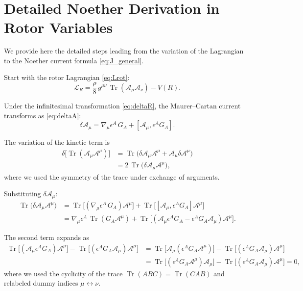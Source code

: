 \documentclass[11pt,a4paper]{article}
\numberwithin{equation}{section}
\theoremstyle{plain}
\theoremstyle{definition}
\theoremstyle{remark}
\DeclareMathOperator{\Tr}{Tr}
\begin{document}
\appendix

\section{Detailed Noether Derivation in Rotor Variables}
\label{app:noether-deriv}

We provide here the detailed steps leading from the variation of the Lagrangian to the Noether current formula \eqref{eq:J_general}.

Start with the rotor Lagrangian \eqref{eq:Lrot}:
\begin{equation}
\mathcal{L}_R = \frac{\rho}{8}\, g^{\mu\nu}\,\Tr(\mathcal{A}_\mu\mathcal{A}_\nu) - V(R).
\end{equation}

Under the infinitesimal transformation \eqref{eq:deltaR}, the Maurer--Cartan current transforms as \eqref{eq:deltaA}:
\begin{equation}
\delta \mathcal{A}_\mu = \nabla_\mu\epsilon^A\, G_A + [\mathcal{A}_\mu, \epsilon^A G_A].
\end{equation}

The variation of the kinetic term is
\begin{align}
\delta\!\big[\Tr(\mathcal{A}_\mu\mathcal{A}^\mu)\big]
&= \Tr\!\big(\delta\mathcal{A}_\mu \mathcal{A}^\mu + \mathcal{A}_\mu \delta\mathcal{A}^\mu\big) \nonumber\\
&= 2\,\Tr\!\big(\delta\mathcal{A}_\mu \mathcal{A}^\mu\big),
\end{align}
where we used the symmetry of the trace under exchange of arguments.

Substituting $\delta\mathcal{A}_\mu$:
\begin{align}
\Tr\!\big(\delta\mathcal{A}_\mu \mathcal{A}^\mu\big)
&= \Tr\!\big[(\nabla_\mu\epsilon^A\, G_A)\mathcal{A}^\mu\big] + \Tr\!\big[[\mathcal{A}_\mu, \epsilon^A G_A]\mathcal{A}^\mu\big] \nonumber\\
&= \nabla_\mu\epsilon^A\,\Tr(G_A \mathcal{A}^\mu) + \Tr\!\big[(\mathcal{A}_\mu \epsilon^A G_A - \epsilon^A G_A \mathcal{A}_\mu)\mathcal{A}^\mu\big].
\end{align}

The second term expands as
\begin{align}
\Tr\!\big[(\mathcal{A}_\mu \epsilon^A G_A)\mathcal{A}^\mu\big] - \Tr\!\big[(\epsilon^A G_A \mathcal{A}_\mu)\mathcal{A}^\mu\big]
&= \Tr\!\big[\mathcal{A}_\mu (\epsilon^A G_A \mathcal{A}^\mu)\big] - \Tr\!\big[(\epsilon^A G_A \mathcal{A}_\mu)\mathcal{A}^\mu\big] \nonumber\\
&= \Tr\!\big[(\epsilon^A G_A \mathcal{A}^\mu)\mathcal{A}_\mu\big] - \Tr\!\big[(\epsilon^A G_A \mathcal{A}_\mu)\mathcal{A}^\mu\big] = 0,
\end{align}
where we used the cyclicity of the trace $\Tr(ABC) = \Tr(CAB)$ and relabeled dummy indices $\mu \leftrightarrow \nu$.
\end{document}
